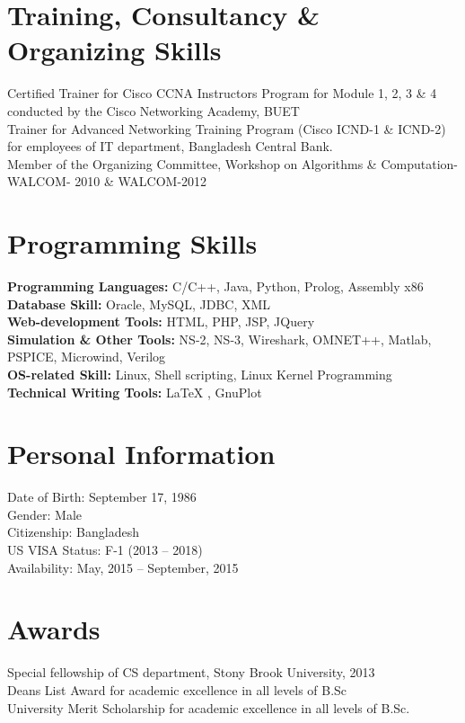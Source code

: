 \documentclass[]{friggeri-cv} %
\begin{document}
\section{Training, Consultancy \& Organizing Skills}
	\bullet{ } Certified Trainer for Cisco CCNA Instructor\textquotesingle{}s
	Program for Module 1, 2, 3 \& 4 conducted by the Cisco Networking Academy, BUET
	\\ \bullet{ }  Trainer for Advanced Networking Training Program (Cisco ICND-1
	\& ICND-2) for employees of IT department, Bangladesh Central Bank.
	\\ \bullet{ } Member of the Organizing Committee, Workshop on Algorithms \&
	Computation- WALCOM- 2010 \& WALCOM-2012 
\section{Programming Skills}
	\bullet{ }\textbf{Programming Languages: } C/C++, Java, Python, Prolog,
	Assembly x86 \\ 
	\bullet{ }\textbf{Database Skill: }Oracle, MySQL, JDBC, XML \\
	\bullet{ }\textbf{Web-development Tools: }HTML, PHP, JSP, JQuery\\
	\bullet{ }\textbf{Simulation \& Other Tools: }NS-2, NS-3, Wireshark, OMNET++,
	Matlab, PSPICE, Microwind, Verilog\\
	\bullet{ }\textbf{OS-related Skill: }Linux, Shell scripting, Linux Kernel
	Programming \\
	 \bullet{ }\textbf{Technical Writing Tools: }\LaTeX{ },
	GnuPlot
\section{Personal Information}
	\bullet{ } {Date of Birth: } September 17, 1986 \\
	\bullet{ } {Gender: } Male \\
	\bullet{ } {Citizenship: } Bangladesh \\
	\bullet{ } {US VISA Status: } F-1 (2013 -- 2018) \\
	\bullet{ } {Availability: } May, 2015 -- September, 2015
\section{Awards}
 \bullet{ }Special fellowship of CS department, Stony Brook University, 2013 \\
 \bullet{ }Dean\textquotesingle{}s List Award for academic excellence in all levels of B.Sc \\
 \bullet{ } University Merit Scholarship for academic excellence in all levels
 			of B.Sc.
\end{document}
